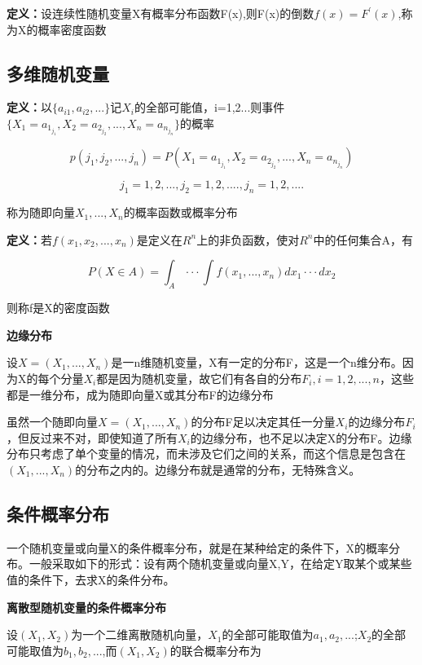 \documentclass{ctexart}
\begin{document}
	\textbf{定义：}设连续性随机变量X有概率分布函数F(x),则F(x)的倒数\(f(x)=F^{'} (x)\),称为X的概率密度函数
	
	\subsection{多维随机变量}
	
	\textbf{定义：}以\(\{a_{i1},a_{i2},...\}\)记\(X_i\)的全部可能值，i=1,2...则事件\(\{X_1=a_{1_{j_1}}, X_2=a_{2_{j_2}},...,X_n=a_{n_{j_n}}\}\)的概率
	
	\[p(j_1,j_2,...,j_n)=P(X_1=a_{1_{j_1}}, X_2=a_{2_{j_2}},...,X_n=a_{n_{j_n}})\]
	
	\[j_1=1,2,..., j_2=1,2,...., j_n=1,2,....\]
	
	称为随即向量\(X_1,...,X_n\)的概率函数或概率分布
	
	\textbf{定义：}若\(f(x_1,x_2,...,x_n)\)是定义在\(R^n\)上的非负函数，使对\(R^n\)中的任何集合A，有
	
	\[P(X \in A) = \int_A···\int f(x_1,...,x_n)dx_1···dx_2\]
	
	则称f是X的密度函数
	
	\mbox{}
	
	\textbf{边缘分布}
	
	设\(X=(X_1,...,X_n)\)是一n维随机变量，X有一定的分布F，这是一个n维分布。因为X的每个分量\(X_i\)都是因为随机变量，故它们有各自的分布\(F_i,i=1,2,...,n\)，这些都是一维分布，成为随即向量X或其分布F的边缘分布
	
	虽然一个随即向量\(X=(X_1,...,X_n)\)的分布F足以决定其任一分量\(X_i\)的边缘分布\(F_i\)，但反过来不对，即使知道了所有\(X_i\)的边缘分布，也不足以决定X的分布F。边缘分布只考虑了单个变量的情况，而未涉及它们之间的关系，而这个信息是包含在\((X_1,...,X_n)\)的分布之内的。边缘分布就是通常的分布，无特殊含义。
	
	\subsection{条件概率分布}
	
	一个随机变量或向量X的条件概率分布，就是在某种给定的条件下，X的概率分布。一般采取如下的形式：设有两个随机变量或向量X,Y，在给定Y取某个或某些值的条件下，去求X的条件分布。
	
	\mbox{}
	
	\textbf{离散型随机变量的条件概率分布}
	
	设\((X_1,X_2)\)为一个二维离散随机向量，\(X_1\)的全部可能取值为\(a_1,a_2,...\);\(X_2\)的全部可能取值为\(b_1,b_2,...\),而\((X_1,X_2)\)的联合概率分布为
	
\end{document}
